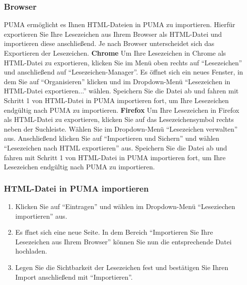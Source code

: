 \documentclass[a4paper,11pt,twoside]{scrbook}
\begin{document}
\subsubsection{Browser}
PUMA ermöglicht es Ihnen HTML-Dateien in PUMA zu importieren. Hierfür exportieren Sie Ihre Lesezeichen aus Ihrem Browser als HTML-Datei und importieren diese anschließend. Je nach Browser unterscheidet sich das Exportieren der Lesezeichen.
\newline
\newline
\textbf{Chrome}%
\newline Um Ihre Lesezeichen in Chrome als HTML-Datei zu exportieren, klicken Sie im Menü oben rechts auf \enquote{Lesezeichen} und anschließend auf \enquote{Lesezeichen-Manager}. Es öffnet sich ein neues Fenster, in dem Sie auf \enquote{Organisieren} klicken und im Dropdown-Menü \enquote{Lesezeichen in HTML-Datei exportieren...} wählen. Speichern Sie die Datei ab und fahren mit Schritt 1 von HTML-Datei in PUMA importieren fort, um Ihre Lesezeichen endgültig nach PUMA zu importieren.  
\newline
\newline
\textbf{Firefox}
\newline Um Ihre Lesezeichen in Firefox als HTML-Datei zu exportieren, klicken Sie auf das Lesezeichensymbol rechts neben der Suchleiste. Wählen Sie im Dropdown-Menü \enquote{Lesezeichen verwalten} aus. Anschließend klicken Sie auf \enquote{Importieren und Sichern} und wählen \enquote{Lesezeichen nach HTML exportieren} aus. Speichern Sie die Datei ab und fahren mit Schritt 1 von HTML-Datei in PUMA importieren fort, um Ihre Lesezeichen endgültig nach PUMA zu importieren.  
\subsubsection{HTML-Datei in PUMA importieren}
\begin{enumerate}
    \item Klicken Sie auf \enquote{Eintragen} und wählen im Dropdown-Menü \enquote{Leseziechen importieren} aus.
    \item Es ffnet sich eine neue Seite. In dem Bereich \enquote{Importieren Sie Ihre Lesezeichen aus Ihrem Browser} können Sie nun die entsprechende Datei hochladen. 
    \item Legen Sie die Sichtbarkeit der Lesezeichen fest und bestätigen Sie Ihren Import anschließend mit \enquote{Importieren}.
\end{enumerate}
\end{document}
